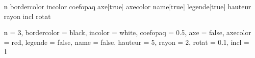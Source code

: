

 {n}{}
 {bordercolor}{}
 {incolor}{}
 {coefopaq}{}
 {axe}[true]{}
 {axecolor}{}
 {name}[true]{}
 {legende}[true]{}
 {hauteur}{}
 {rayon}{}
 {incl}{}
 {rotat}{}

 {
								n = 3,
								bordercolor = black,
 							 	incolor = white,
 							 	coefopaq = 0.5,
 							 	axe = false,
 							 	axecolor = red,
 							 	legende = false,	
								name = false,
 							 	hauteur = 5,
 							 	rayon = 2,
 							 	rotat = 0.1,
 							 	incl = 1}{}

\newcommand*{\prismereg}[1][]{\pasPrismereg[#1]}

